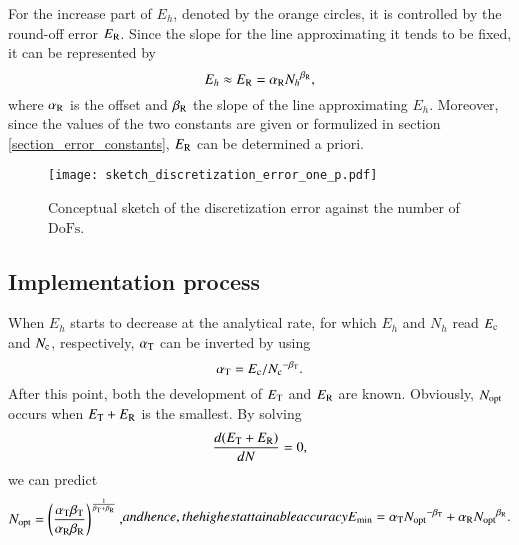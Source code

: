 \documentclass[review,3p]{elsarticle}
\begin{document}
For the increase part of $E_h$, denoted by the orange circles, it is controlled by the round-off error $E_{\rm R}$. Since the slope for the line approximating it tends to be fixed\cite{Babuska2018Roundoff,WalterFrei}, it can be represented by 
\begin{equation}
 E_{h} \approx E_{\rm R} = \alpha_{\rm R}{N_{h}}^{\beta_{\rm R}},		\label{formula_round-off_error}
\end{equation}
where $\alpha_{\rm R}$ is the offset and $\beta_{\rm R}$ the slope of the line approximating $E_h$. Moreover, since the values of the two constants are given or formulized in section \ref{section_error_constants}, $E_{\rm R}$ can be determined a priori.

 \begin{figure}[!ht]
 \centering
     \texttt{[image: sketch\_discretization\_error\_one\_p.pdf]}
     \caption{Conceptual sketch of the discretization error against the number of $\text{DoFs}$.}
     \label{sketch_discretization_error_one_p}
 \end{figure}

\subsection{Implementation process}           \label{section_strategy}

When $E_h$ starts to decrease at the analytical rate, for which $E_h$ and $N_h$ read ${E_{\rm c}}$ and ${N_{\rm c}}$, respectively, $\alpha_{\rm T}$ can be inverted by using
\begin{equation}
 \alpha_{\rm T} = {E_{\rm c}}/{N_{\rm c}}^{- \beta_{\rm T}}.		\label{formula_offset_truncation_error}
\end{equation}
After this point, both the development of $E_{\rm T}$ and $E_{\rm R}$ are known. Obviously, $N_{\rm opt}$ occurs when $E_{\rm T}+E_{\rm R}$ is the smallest. By solving
\begin{equation}
    \frac{d(E_{\rm T}+E_{\rm R})}{dN}=0,    \label{derivative_condition_N_opt}
\end{equation}
we can predict
\begin{subequations}
\begin{align}
 N_{\rm opt} = \left( \frac{\alpha_{\rm T} \beta_{\rm T}}{\alpha _{\rm R} \beta_{\rm R}} \right)^{\frac{1}{\beta_{\rm T} + \beta_{\rm R}}},
\end{align}
and hence, the highest attainable accuracy
\begin{align}
 E_{\rm min} = \alpha_{\rm T} {N_{\rm opt}}^{- {\beta _{\rm T}}}+\alpha_{\rm R} {N_{\rm opt}}^{{\beta _{\rm R}}}.
\end{align}
\end{subequations}
\end{document}
